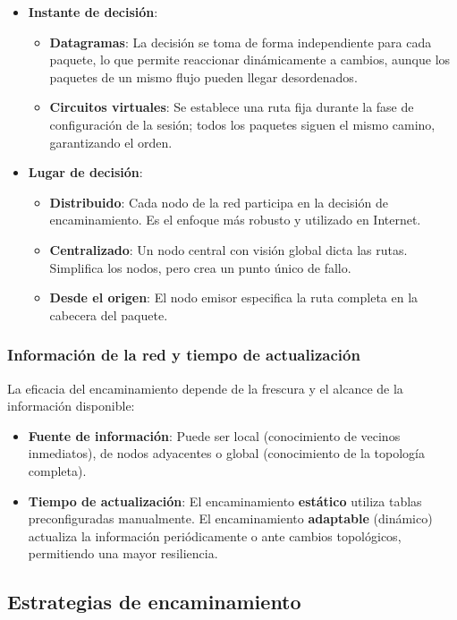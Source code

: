\begin{itemize}
    \item \textbf{Instante de decisión}: 
    \begin{itemize}
        \item \textbf{Datagramas}: La decisión se toma de forma independiente para cada paquete, lo que permite reaccionar dinámicamente a cambios, aunque los paquetes de un mismo flujo pueden llegar desordenados.
        \item \textbf{Circuitos virtuales}: Se establece una ruta fija durante la fase de configuración de la sesión; todos los paquetes siguen el mismo camino, garantizando el orden.
    \end{itemize}
    \item \textbf{Lugar de decisión}:
    \begin{itemize}
        \item \textbf{Distribuido}: Cada nodo de la red participa en la decisión de encaminamiento. Es el enfoque más robusto y utilizado en Internet.
        \item \textbf{Centralizado}: Un nodo central con visión global dicta las rutas. Simplifica los nodos, pero crea un punto único de fallo.
        \item \textbf{Desde el origen}: El nodo emisor especifica la ruta completa en la cabecera del paquete.
    \end{itemize}
\end{itemize}

\subsubsection{Información de la red y tiempo de actualización}

La eficacia del encaminamiento depende de la frescura y el alcance de la información disponible:
\begin{itemize}
    \item \textbf{Fuente de información}: Puede ser local (conocimiento de vecinos inmediatos), de nodos adyacentes o global (conocimiento de la topología completa).
    \item \textbf{Tiempo de actualización}: El encaminamiento \textbf{estático} utiliza tablas preconfiguradas manualmente. El encaminamiento \textbf{adaptable} (dinámico) actualiza la información periódicamente o ante cambios topológicos, permitiendo una mayor resiliencia.
\end{itemize}

\subsection{Estrategias de encaminamiento}


